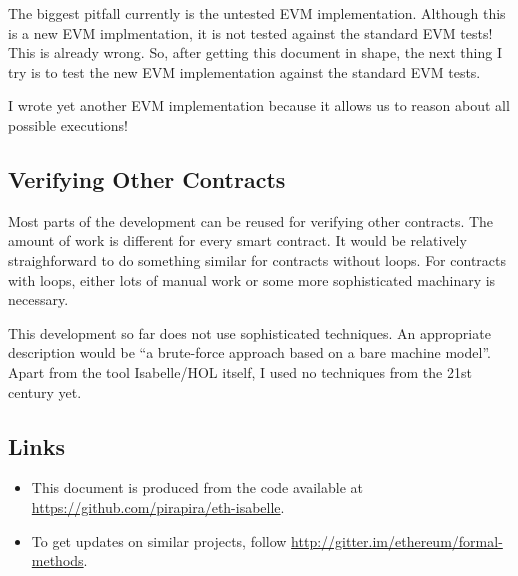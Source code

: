 \documentclass[11pt,a4paper]{article}
\begin{document}
The biggest pitfall currently is the untested EVM implementation.
Although this is a new EVM implmentation, it is not
tested against the standard EVM tests!  This is already wrong.
So, after getting this document in shape, the next thing I try is to
test the new EVM implementation against the standard EVM tests.

I wrote yet another EVM implementation because it allows us to reason about all possible executions!

\subsection{Verifying Other Contracts}

Most parts of the development can be reused for verifying other contracts.
The amount of work is
different for every smart contract.  It would be relatively
straighforward to do something similar for
contracts without loops.  For contracts with loops,
either lots of manual work or some more
sophisticated machinary is necessary.

This development so far does not use sophisticated techniques.
An appropriate description would be ``a brute-force approach based on a bare machine model''.
Apart from the tool Isabelle/HOL itself, I used no techniques from the 21st century yet.

\subsection{Links}

\begin{itemize}
\item This document is produced from the code available at
\url{https://github.com/pirapira/eth-isabelle}.
\item To get updates on similar projects, follow \url{http://gitter.im/ethereum/formal-methods}.
\end{itemize}



%
%
\end{document}
